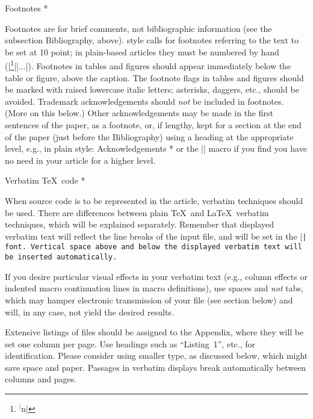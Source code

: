 \subhead * Footnotes *
 
Footnotes are for brief comments, not bibliographic information (see the
subsection Bibliography, above).  \TUB\/ style calls for footnotes
referring to the text to be set at 10 point; in plain-based articles
they must be numbered by hand
(|\footnote{$^|$n$|$}|\hskip0pt\relax|{...}|).
Footnotes in tables
and figures should appear immediately below the table or figure, above
the caption.  The footnote flags in tables and figures should be marked
with raised lowercase italic letters; asterisks, daggers, etc., should
be avoided.  Trademark acknowledgements should {\it not\/} be included in
footnotes.  (More on this below.) Other acknowledgements may be made in
the first sentences of the paper, as a footnote, or, if lengthy, kept
for a section at the end of the paper (just before the Bibliography)
using a heading at the appropriate level, e.g., in plain style:
\verbatim
\head * Acknowledgements *
\endverbatim
or the |\subhead| macro if you find you have no need in your article for
a higher level.
 
\subhead * Verbatim \TeX\ code *
 
When source code is to be represented in the article, verbatim
techniques should be used.  There are differences between plain \TeX\
and \LaTeX\ verbatim techniques, which will be explained separately.
Remember that displayed verbatim text will reflect the line breaks of
the input file, and will be set in the |\tt| font.  Vertical space above
and below the displayed verbatim text will be inserted automatically.
 
If you desire particular visual effects in your verbatim text (e.g.,
column effects or indented macro continuation lines in macro
definitions), use spaces and {\it not\/} tabs, which may hamper
electronic transmission of your file (see section below) and will, in
any case, not yield the desired results.
 
Extensive listings of files should be assigned to the Appendix, where
they will be set one column per page.  Use headings such as
``Listing~1'', etc., for identification.  Please consider using smaller
type, as discussed below, which might save space and paper.  Passages in
verbatim displays break automatically between columns and pages.
 
